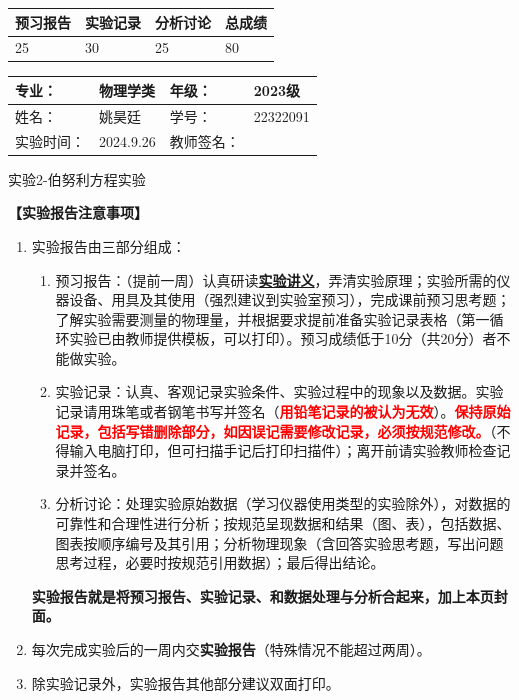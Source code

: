 \documentclass[dvipsnames, svgnames,a4paper,11pt]{article}
\begin{document}
\begin{table}
	\renewcommand\arraystretch{1.7}
	\begin{tabularx}{\textwidth}{
		|X|X|X|X
		|X|X|X|X|}
	\hline
	\multicolumn{2}{|c|}{预习报告}&\multicolumn{2}{|c|}{实验记录}&\multicolumn{2}{|c|}{分析讨论}&\multicolumn{2}{|c|}{总成绩}\\
	\hline
	25& &30 & &25 & &80 & \\
	\hline
	\end{tabularx}
\end{table}


\begin{table}
	\renewcommand\arraystretch{1.7}
	\begin{tabularx}{\textwidth}{|X|X|X|X|}
	\hline
	专业：& 物理学类 &年级：& 2023级\\
	\hline
	姓名：& 姚昊廷  & 学号：&22322091\\
	\hline
	实验时间：& 2024.9.26& 教师签名：& \\
	\hline
	\end{tabularx}
\end{table}

\begin{center}
	\LARGE 实验2-伯努利方程实验
\end{center}

\textbf{【实验报告注意事项】}
\begin{enumerate}
	\item 实验报告由三部分组成：
	\begin{enumerate}
		\item 预习报告：（提前一周）认真研读\underline{\textbf{实验讲义}}，弄清实验原理；实验所需的仪器设备、用具及其使用（强烈建议到实验室预习），完成课前预习思考题；了解实验需要测量的物理量，并根据要求提前准备实验记录表格（第一循环实验已由教师提供模板，可以打印）。预习成绩低于10分（共20分）者不能做实验。
	    \item 实验记录：认真、客观记录实验条件、实验过程中的现象以及数据。实验记录请用珠笔或者钢笔书写并签名（\textcolor{red}{\textbf{用铅笔记录的被认为无效}}）。\textcolor{red}{\textbf{保持原始记录，包括写错删除部分，如因误记需要修改记录，必须按规范修改。}}（不得输入电脑打印，但可扫描手记后打印扫描件）；离开前请实验教师检查记录并签名。
	    \item 分析讨论：处理实验原始数据（学习仪器使用类型的实验除外），对数据的可靠性和合理性进行分析；按规范呈现数据和结果（图、表），包括数据、图表按顺序编号及其引用；分析物理现象（含回答实验思考题，写出问题思考过程，必要时按规范引用数据）；最后得出结论。
	\end{enumerate}
	\textbf{实验报告就是将预习报告、实验记录、和数据处理与分析合起来，加上本页封面。}
	\item 每次完成实验后的一周内交\textbf{实验报告}（特殊情况不能超过两周）。
	\item 除实验记录外，实验报告其他部分建议双面打印。
\end{enumerate}
\end{document}
